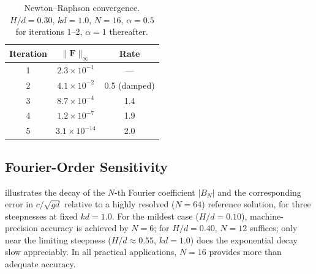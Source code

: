 \documentclass[journal,10pt,twocolumn]{IEEEtran}
\begin{document}
\begin{table}[!t]
    \centering
    \caption{Newton--Raphson convergence.
             $H/d=0.30$, $kd=1.0$, $N=16$, $\alpha=0.5$ for
             iterations 1--2, $\alpha=1$ thereafter.}
    \label{tab:convergence}
    \renewcommand{\arraystretch}{1.2}
    \begin{tabular}{@{}ccc@{}}
        \toprule
        \textbf{Iteration} & $\|\mathbf{F}\|_\infty$ & \textbf{Rate} \\
        \midrule
        1 & $2.3\times10^{-1}$ & --- \\
        2 & $4.1\times10^{-2}$ & 0.5 (damped) \\
        3 & $8.7\times10^{-4}$ & 1.4 \\
        4 & $1.2\times10^{-7}$ & 1.9 \\
        5 & $3.1\times10^{-14}$& 2.0 \\
        \bottomrule
    \end{tabular}
\end{table}

\subsection{Fourier-Order Sensitivity}

 illustrates the decay of the $N$-th Fourier
coefficient $|B_N|$ and the corresponding error in $c/\sqrt{gd}$
relative to a highly resolved ($N=64$) reference solution, for
three steepnesses at fixed $kd = 1.0$.
For the mildest case ($H/d = 0.10$), machine-precision accuracy is
achieved by $N = 6$; for $H/d = 0.40$, $N = 12$ suffices; only
near the limiting steepness ($H/d \approx 0.55$, $kd = 1.0$) does
the exponential decay slow appreciably.
In all practical applications, $N = 16$ provides more than adequate
accuracy.
\end{document}
